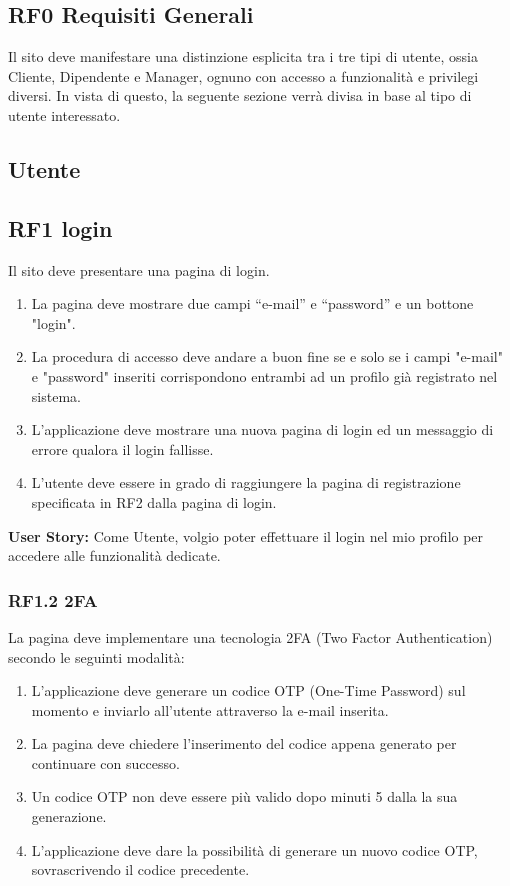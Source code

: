 \documentclass{report}
\begin{document}
\subsection*{RF0 Requisiti Generali}
Il sito deve manifestare una distinzione esplicita tra i tre tipi di utente, ossia Cliente, Dipendente e Manager, ognuno con accesso a funzionalità e privilegi diversi.
In vista di questo, la seguente sezione verrà divisa in base al tipo di utente interessato.

\subsection{Utente}

\subsection*{RF1 login}
Il sito deve presentare una pagina di login.

\begin{enumerate}
	\item La pagina deve mostrare due campi “e-mail” e “password” e un bottone "login".
	
	\item La procedura di accesso deve andare a buon fine se e solo se i campi "e-mail" e "password" inseriti corrispondono entrambi ad un profilo già registrato nel sistema.
	
	\item L'applicazione deve mostrare una nuova pagina di login ed un messaggio di errore qualora il login fallisse.
	
	\item L’utente deve essere in grado di raggiungere la pagina di registrazione specificata in RF2 dalla pagina di login.
\end{enumerate}


\textbf{User Story:}
Come Utente, volgio poter effettuare il login nel mio profilo per accedere alle funzionalità dedicate.

	\subsubsection{RF1.2 2FA}
	La pagina deve implementare una tecnologia 2FA (Two Factor Authentication) secondo le seguinti modalità:
	
	\begin{enumerate}
	\item L'applicazione deve generare un codice OTP (One-Time Password) sul momento e inviarlo all'utente attraverso la e-mail inserita.
	
	\item 	La pagina deve chiedere l'inserimento del codice appena generato per continuare con successo.
	
	\item Un codice OTP non deve essere più valido dopo minuti 5 dalla la sua generazione.
	
	\item L'applicazione deve dare la possibilità di generare un nuovo codice OTP, sovrascrivendo il codice precedente.

	\end{enumerate}
	
\end{document}
